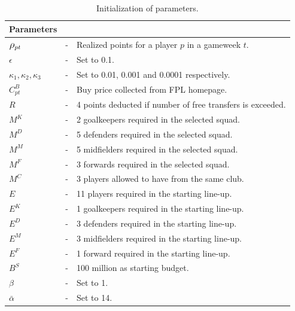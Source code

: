 \begin{table}[H] 
\tabcolsep=0.11cm
\centering
\caption{Initialization of parameters.}
\begin{tabular}{@{}lll@{}}
\toprule
Parameters                       &   &                                                                                                \\ \midrule
$\mathlarger{\rho_{pt}}$ & - & Realized points for a player $p$ in a gameweek $t$. \\
$\epsilon$                       & - & Set to 0.1.                                                                     \\
$\kappa_{1}, \kappa_{2}, \kappa_{3} $                     & - & Set to 0.01, 0.001 and 0.0001 respectively.                                               \\
$C_{pt}^{B}$                     & - & Buy price collected from FPL homepage.  \\ 
$R$                              & - & 4 points deducted if number of free transfers is exceeded.       \\
$M^{K}$                          & - &  2 goalkeepers required in the selected squad.                                      \\
$M^{D}$                          & - &  5 defenders required in the selected squad.                         \\
$M^{M}$                          & - & 5 midfielders required in the selected squad.                                     \\
$M^{F}$                          & - & 3 forwards required in the selected squad.                                    \\
$M^{C}$                          & - & 3 players allowed to have from the same club.                                \\
$E$                              & - & 11 players required in the starting line-up.                              \\
$E^{K}$                          & - & 1 goalkeepers required in the starting line-up.                                       \\
$E^{D}$                          & - & 3 defenders required in the starting line-up.                  \\
$E^{M}$                          & - & 3 midfielders required in the starting line-up.                                 \\
$E^{F}$                          & - & 1 forward required in the starting line-up.                     \\
$B^{S}$                          & - & 100 million as starting budget.                                                                              \\
$\beta$                          & - & Set to 1.                                                                                  \\          
$\bar{\alpha}$                   & - & Set to 14.                                                                      \\


\end{tabular}
\end{table}
